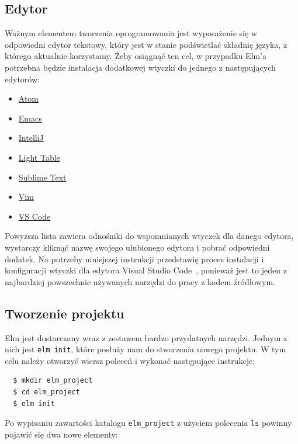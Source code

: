 \documentclass[twoside,a4paper]{report}
\begin{document}
\subsection{Edytor}
Ważnym elementem tworzenia oprogramowania jest wyposażenie się w odpowiedni edytor tekstowy, który jest w stanie podświetlać składnię języka, z którego aktualnie korzystamy.
Żeby osiągnąć ten cel, w przypadku Elm'a potrzebna będzie instalacja dodatkowej wtyczki do jednego z następujących edytorów:
\begin{itemize}[noitemsep,topsep=0pt]
    \item{\href{https://atom.io/packages/language-elm}{Atom}}
    \item{\href{https://github.com/jcollard/elm-mode}{Emacs}}
    \item{\href{https://github.com/klazuka/intellij-elm}{IntelliJ}}
    \item{\href{https://github.com/rundis/elm-light}{Light Table}}
    \item{\href{https://github.com/evancz/elm-syntax-highlighting/}{Sublime Text}}
    \item{\href{https://github.com/elm-tooling/elm-vim}{Vim}}
    \item{\href{https://github.com/elm-tooling/elm-language-client-vscode}{VS Code}}
\end{itemize}

Powyższa lista zawiera odnośniki do wspomnianych wtyczek dla danego edytora, wystarczy kliknąć nazwę swojego ulubionego edytora i pobrać odpowiedni dodatek.
Na potrzeby niniejszej instrukcji przedstawię proces instalacji i konfiguracji wtyczki dla edytora Visual Studio Code~\cite{vscode}, ponieważ jest to jeden z najbardziej powszechnie używanych narzędzi do pracy z kodem źródłowym.

\subsection{Tworzenie projektu}
Elm jest dostarczany wraz z zestawem bardzo przydatnych narzędzi.
Jednym z nich jest \texttt{elm init}, które posłuży nam do stworzenia nowego projektu.
W tym celu należy otworzyć wiersz poleceń i wykonać następujące instrukcje:
\begin{lstlisting}
  $ mkdir elm_project
  $ cd elm_project
  $ elm init
\end{lstlisting}

Po wypisaniu zawartości katalogu \texttt{elm\_project} z użyciem polecenia \texttt{ls} powinny pojawić się dwa nowe elementy:
\end{document}
